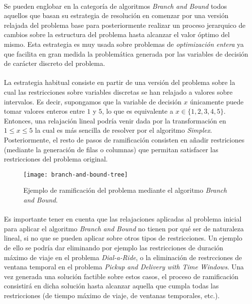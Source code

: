 \documentclass{subfiles}
\begin{document}
        \paragraph{}
        Se pueden englobar en la categoría de algoritmos \emph{Branch and Bound} todos aquellos que basan su estrategia de resolución en comenzar por una versión relajada del problema base para posteriormente realizar un proceso jerarquico de cambios sobre la estructura del problema hasta alcanzar el valor óptimo del mismo. Esta estrategia es muy usada sobre problemas de \emph{optimización entera} ya que facilita en gran medida la problemática generada por las variables de decisión de carácter discreto del problema.

        \paragraph{}
        La estrategia habitual consiste en partir de una versión del problema sobre la cual las restricciones sobre variables discretas se han relajado a valores sobre intervalos. Es decir, supongamos que la variable de decisión $x$ únicamente puede tomar valores enteros entre $1$ y $5$, lo que es equivalente a $x \in \{1,2,3,4,5\}$. Entonces, una relajación lineal podría venir dada por la transformación en $1 \leq x \leq 5$ la cual es más sencilla de resolver por el algoritmo \emph{Simplex}. Posteriormente, el resto de pasos de ramificación consisten en añadir restriciones (mediante la generación de filas o columnas) que permitan satisfacer las restricciones del problema original.

        \begin{figure}[ht]
          \centering
          \texttt{[image: branch-and-bound-tree]}
          \caption{Ejemplo de ramificación del problema mediante el algoritmo \emph{Branch and Bound}.}
          \label{img:branch_and_bound}
        \end{figure}

        \paragraph{}
        Es importante tener en cuenta que las relajaciones aplicadas al problema inicial para aplicar el algoritmo \emph{Branch and Bound} no tienen por qué ser de naturaleza lineal, si no que se pueden aplicar sobre otros tipos de restricciones. Un ejemplo de ello se podría dar eliminando por ejemplo las restricciones de duración máximo de viaje en el problema \emph{Dial-a-Ride}, o la eliminación de restrcciones de ventana temporal en el problema \emph{Pickup and Delivery with Time Windows}. Una vez generada una solución factible sobre estos casos, el proceso de ramificación consistirá en  dicha solución hasta alcanzar aquella que cumpla todas las restricciones (de tiempo máximo de viaje, de ventanas temporales, etc.).
\end{document}
